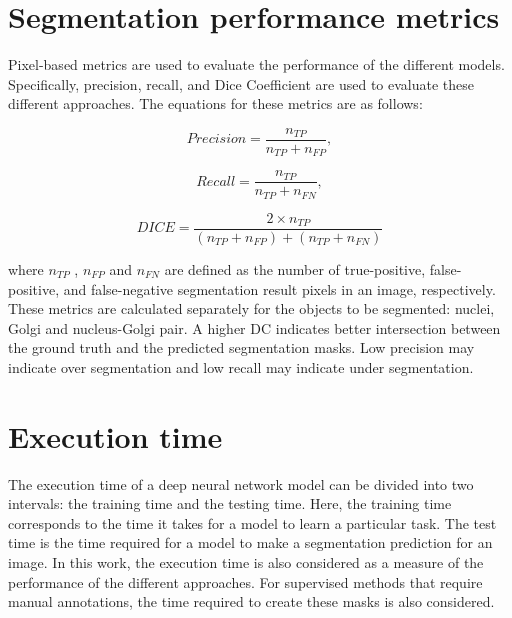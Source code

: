 \section{Segmentation performance metrics}
\label{section:metrics}

Pixel-based metrics are used to evaluate the performance of the different models. Specifically, precision, recall, and Dice Coefficient are used to evaluate these different approaches. The equations for these metrics are as follows:

\begin{equation}
    Precision = \frac{n_{TP}}{n_{TP}+n_{FP}},
\end{equation}

\begin{equation}
    Recall = \frac{n_{TP}}{n_{TP}+n_{FN}},
\end{equation}

\begin{equation}
 DICE =\frac{2 \times n_{TP}}{(n_{TP}+n_{FP})+(n_{TP}+n_{FN})}
\end{equation}

\noindent where $n_{TP}$ , $n_{FP}$ and $n_{FN}$ are defined as the number of true-positive, false-positive, and false-negative segmentation result pixels in an image, respectively. These metrics are calculated separately for the objects to be segmented: nuclei, Golgi and nucleus-Golgi pair. A higher \ac{DC} indicates better intersection between the ground truth and the predicted segmentation masks. Low precision may indicate over segmentation and low recall may indicate under segmentation.

\section{Execution time}

The execution time of a deep neural network model can be divided into two intervals: the training time and the testing time. Here, the training time corresponds to the time it takes for a model to learn a particular task. The test time is the time required for a model to make a segmentation prediction for an image. In this work, the execution time is also considered as a measure of the performance of the different approaches. For supervised methods that require manual annotations, the time required to create these masks is also considered.